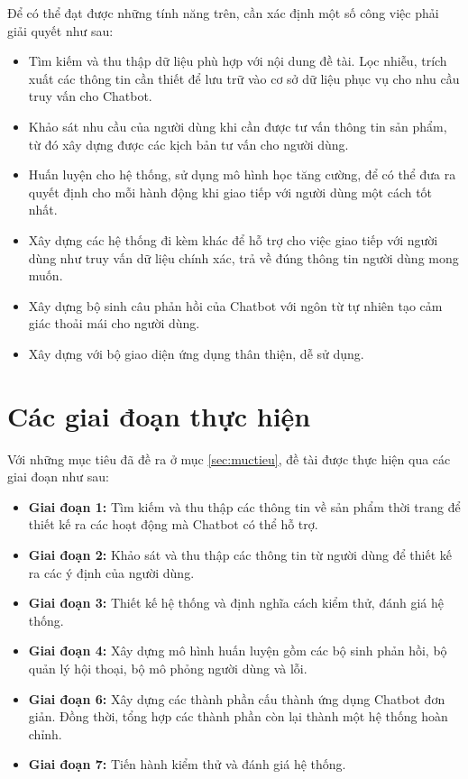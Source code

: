 Để có thể đạt được những tính năng trên, cần xác định một số công việc phải giải quyết như sau:

\begin{itemize}
    \item Tìm kiếm và thu thập dữ liệu phù hợp với nội dung đề tài. Lọc nhiễu, trích xuất các thông tin cần thiết để lưu trữ vào cơ sở dữ liệu phục vụ cho nhu cầu truy vấn cho Chatbot.
    \item Khảo sát nhu cầu của người dùng khi cần được tư vấn thông tin sản phẩm, từ đó xây dựng được các kịch bản tư vấn cho người dùng.
    \item Huấn luyện cho hệ thống, sử dụng mô hình học tăng cường, để có thể đưa ra quyết định cho mỗi hành động khi giao tiếp với người dùng một cách tốt nhất.
    \item Xây dựng các hệ thống đi kèm khác để hỗ trợ cho việc giao tiếp với người dùng như truy vấn dữ liệu chính xác, trả về đúng thông tin người dùng mong muốn.
    \item Xây dựng bộ sinh câu phản hồi của Chatbot với ngôn từ tự nhiên tạo cảm giác thoải mái cho người dùng.
    \item Xây dựng với bộ giao diện ứng dụng thân thiện, dễ sử dụng.
\end{itemize}

\section{Các giai đoạn thực hiện}
Với những mục tiêu đã đề ra ở mục \ref{sec:muctieu}, đề tài được thực hiện qua các giai đoạn như sau:

\begin{itemize}
    \item \textbf{Giai đoạn 1:} Tìm kiếm và thu thập các thông tin về sản phẩm thời trang để thiết kế ra các hoạt động mà Chatbot có thể hỗ trợ.
    \item \textbf{Giai đoạn 2:} Khảo sát và thu thập các thông tin từ người dùng để thiết kế ra các ý định của người dùng.
    \item \textbf{Giai đoạn 3:} Thiết kế hệ thống và định nghĩa cách kiểm thử, đánh giá hệ thống.
    \item \textbf{Giai đoạn 4:} Xây dựng mô hình huấn luyện gồm các bộ sinh phản hồi, bộ quản lý hội thoại, bộ mô phỏng người dùng và lỗi.
    \item \textbf{Giai đoạn 6:} Xây dựng các thành phần cấu thành ứng dụng Chatbot đơn giản. Đồng thời, tổng hợp các thành phần còn lại thành một hệ thống hoàn chỉnh.
    \item \textbf{Giai đoạn 7:} Tiến hành kiểm thử và đánh giá hệ thống.
\end{itemize}

